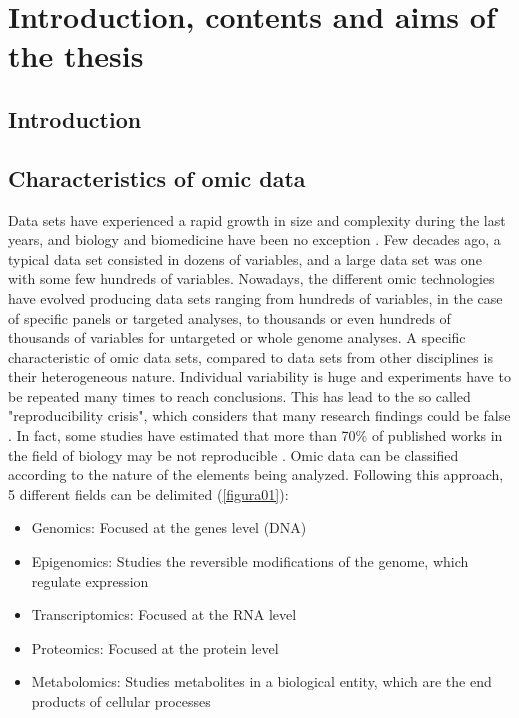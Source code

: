 
\chapter[Introduction, contents and aims of the thesis]{Introduction, contents and aims of the thesis}



\section{Introduction}
\label{sec:Intro}

\section{Characteristics of omic data}
\label{sec:charomicdata}
Data sets have experienced a rapid growth in size and complexity during the last years, and biology and biomedicine have been no exception \parencite{marx2013biology}. Few decades ago, a typical data set consisted in dozens of variables, and a large data set was one with some few hundreds of variables. Nowadays, the different omic technologies have evolved producing data sets ranging from hundreds of variables, in the case of specific panels or targeted analyses, to thousands or even hundreds of thousands of variables for untargeted or whole genome analyses. A specific characteristic of omic data sets, compared to data sets from other disciplines is their heterogeneous nature. Individual variability is huge and experiments have to be repeated many times to reach conclusions. This has lead to the so called "reproducibility crisis", which considers that many research findings could be false \parencite{ioannidis2005most, begley2015reproducibility}. In fact, some studies have estimated that more than 70\% of published works in the field of biology may be not reproducible \parencite{baker20161}.
Omic data can be classified according to the nature of the elements being analyzed. Following this approach, 5 different fields can be delimited (\autoref{figura01}):
\begin{itemize}
    \item Genomics: Focused at the genes level (DNA)
    \item Epigenomics: Studies the reversible modifications of the genome, which regulate expression
    \item Transcriptomics: Focused at the RNA level
    \item Proteomics: Focused at the protein level
    \item Metabolomics: Studies metabolites in a biological entity, which are the end products of cellular processes
\end{itemize}

